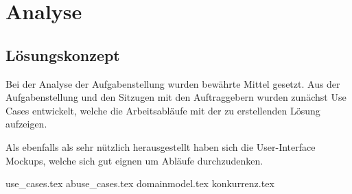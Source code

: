 \chapter{Analyse}
\section{Lösungskonzept}

Bei der Analyse der Aufgabenstellung wurden bewährte Mittel gesetzt. Aus der Aufgabenstellung und den Sitzugen mit den Auftraggebern wurden zunächst Use Cases entwickelt, welche die Arbeitsabläufe mit der zu erstellenden Lösung aufzeigen.

Als ebenfalls als sehr nützlich herausgestellt haben sich die User-Interface Mockups, welche sich gut eignen um Abläufe durchzudenken.


\clearpage
{use_cases.tex}
\clearpage
{abuse_cases.tex}
\clearpage
{domainmodel.tex}
\clearpage
{konkurrenz.tex}

